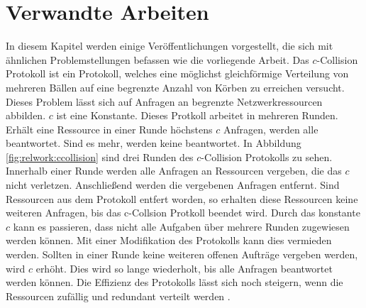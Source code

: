 \chapter{Verwandte Arbeiten}
\label{chap:relwork}
%
In diesem Kapitel werden einige Veröffentlichungen vorgestellt, die sich mit ähnlichen Problemstellungen befassen wie die vorliegende Arbeit.
Das $c$-Collision Protokoll \cite{ccol3} ist ein Protokoll, welches eine möglichst gleichförmige Verteilung von mehreren Bällen auf eine begrenzte Anzahl von Körben zu erreichen versucht. Dieses Problem lässt sich auf Anfragen an begrenzte Netzwerkressourcen abbilden. $c$ ist eine Konstante. Dieses Protkoll arbeitet in mehreren Runden. Erhält eine Ressource in einer Runde höchstens $c$ Anfragen, werden alle beantwortet. Sind es mehr, werden keine beantwortet. In Abbildung \ref{fig:relwork:ccollision} sind drei Runden des $c$-Collision Protokolls zu sehen. Innerhalb einer Runde werden alle Anfragen an Ressourcen vergeben, die das $c$ nicht verletzen. Anschließend werden die vergebenen Anfragen entfernt. Sind Ressourcen aus dem Protokoll entfert worden, so erhalten diese Ressourcen keine weiteren Anfragen, bis das c-Collsion Protkoll beendet wird. Durch das konstante $c$ kann es passieren, dass nicht alle Aufgaben über mehrere Runden zugewiesen werden können. Mit einer Modifikation des Protokolls kann dies vermieden werden. Sollten in einer Runde keine weiteren offenen Aufträge vergeben werden, wird $c$ erhöht. Dies wird so lange wiederholt, bis alle Anfragen beantwortet werden können. Die Effizienz des Protokolls lässt sich noch steigern, wenn die Ressourcen zufällig und redundant verteilt werden \cite{ccol4}.
